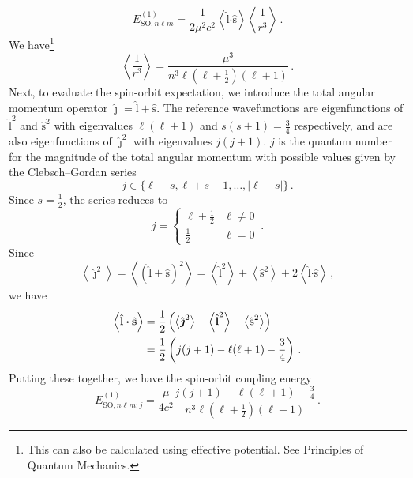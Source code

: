 \documentclass{article}
\theoremstyle{plain}\theoremheaderfont{\normalfont\itshape}\theorembodyfont{\rmfamily}\theoremseparator{.}\newtheorem*{rem}{Remark}\newtheorem*{ex}{Example}\newtheorem*{proof}{Proof}\newtheorem*{altp}{Alternative proof}
\theoremstyle{plain}\theoremheaderfont{\normalfont\bfseries}\theorembodyfont{\rmfamily}\theoremseparator{.}\newtheorem{thm}{Theorem}[section]\newtheorem{lem}[thm]{Lemma}\newtheorem{prop}[thm]{Proposition}\newtheorem*{cor}{Corollary}\newtheorem{defn}[thm]{Definition}\newtheorem{clm}[thm]{Claim}\newtheorem{clminproof}{Claim}
\theoremstyle{break}\theoremheaderfont{\normalfont\itshape}\theorembodyfont{\rmfamily}\theoremseparator{.\medskip}\newtheorem*{proofskip}{Proof}\newtheorem*{exs}{Examples}\newtheorem*{rems}{Remarks}
\theoremstyle{break}\theoremheaderfont{\normalfont\bfseries}\theorembodyfont{\rmfamily}\theoremseparator{.\medskip}\newtheorem{lemskip}[thm]{Lemma}\newtheorem{defnskip}[thm]{Definition}\newtheorem{propskip}[thm]{Proposition}\newtheorem{thmskip}[thm]{Theorem}
\numberwithin{equation}{section}
\newcommand{\eval}[1]{\left\langle #1 \right\rangle}
\newcommand{\vb}[1]{\bm{\mathrm{#1}}}
\newcommand{\vdot}{\bm{\cdot}}
\newcommand{\abs}[1]{\left| #1 \right|}
\begin{document}
    \begin{equation}
        E_{\text{SO},n\ell m}^{(1)}=\frac{1}{2\mu^2c^2}\eval{\hat{\vb{l}}\vdot\hat{\vb{s}}}\eval{\frac{1}{r^3}}\,.
    \end{equation}
    We have\footnote{This can also be calculated using effective potential. See Principles of Quantum Mechanics.}
    \begin{equation}
        \eval{\frac{1}{r^3}}=\frac{\mu^3}{n^3\ell(\ell+\frac{1}{2})(\ell+1)}\,.
    \end{equation}
    Next, to evaluate the spin-orbit expectation, we introduce the total angular momentum operator \(\hat{\vb{\jmath}}=\hat{\vb{l}}+\hat{\vb{s}}\). The reference wavefunctions are eigenfunctions of \(\hat{\vb{l}}^2\) and \(\hat{\vb{s}}^2\) with eigenvalues \(\ell(\ell+1)\) and \(s(s+1)=\frac{3}{4}\) respectively, and are also eigenfunctions of \(\hat{\vb{\jmath}}^2\) with eigenvalues \(j(j+1)\). \(j\) is the quantum number for the magnitude of the total angular momentum with possible values given by the Clebsch--Gordan series
    \begin{equation}
        j\in\{\ell+s,\ell+s-1,\dots,\abs{\ell-s}\}\,.
    \end{equation}
    Since \(s=\frac{1}{2}\), the series reduces to
    \begin{equation}
        j=\begin{cases}
            \ell\pm\frac{1}{2} & \ell\ne 0 \\
            \frac{1}{2} & \ell =0
        \end{cases}\,.
    \end{equation}
    Since
    \begin{equation}
        \eval{\hat{\vb{\jmath}}^2}=\eval{(\hat{\vb{l}}+\hat{\vb{s}})^2}=\eval{\hat{\vb{l}}^2}+\eval{\hat{\vb{s}}^2}+2\eval{\hat{\vb{l}}\vdot\hat{\vb{s}}}\,,
    \end{equation}
    we have
    \begin{align}
        \eval{\hat{\vb{l}}\vdot\hat{\vb{s}}}&=\frac{1}{2}\left(\eval{\hat{\vb{\jmath}}^2}-\eval{\hat{\vb{l}}^2}-\eval{\hat{\vb{s}}^2}\right)\notag \\
        &=\frac{1}{2}\left(j(j+1)-\ell(\ell+1)-\frac{3}{4}\right)\,.
    \end{align}
    Putting these together, we have the spin-orbit coupling energy
    \begin{equation}\label{spin_orbit_coupling}
        E_{\text{SO},n\ell m;j}^{(1)}=\frac{\mu}{4c^2}\frac{j(j+1)-\ell(\ell+1)-\frac{3}{4}}{n^3\ell(\ell+\frac{1}{2})(\ell+1)}\,.
    \end{equation}
\end{document}
